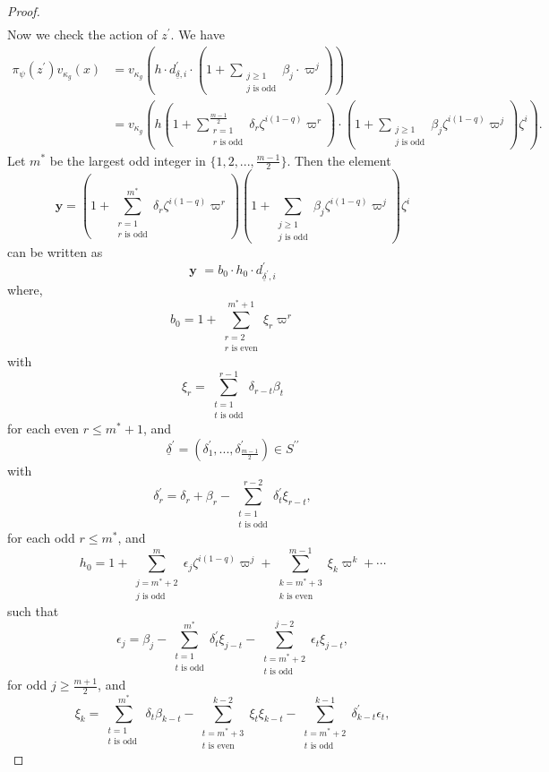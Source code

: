 \documentclass[10pt,a4paper]{amsart}
\begin{document}
\begin{proof}
\begin{align*}
\end{align*}
Now we check the action of $z^\prime$. We have 
\begin{align*}
\pi_\psi(z^\prime) v_{\kappa_g}(x) &= v_{\kappa_g}(h \cdot d_{\underline{\delta}, i}^\prime \cdot (1 + \sum\limits_{\substack{j \geq 1  \\    j \text{ is odd} }}\beta_j \cdot \varpi^j )) \\
&= v_{\kappa_g}\left( h (1 + \sum\limits_{\substack{ r = 1  \\  r \text{ is odd} }}^{\frac{m-1}{2}} \delta_r \zeta^{i(1-q)} \varpi^r)  \cdot (1 + \sum\limits_{\substack{j \geq 1  \\    j \text{ is odd} }}\beta_j  \zeta^{i(1-q)} \varpi^j ) \zeta^i \right).
\end{align*}
Let $m^*$ be the largest odd integer in $\{1,2,...,\frac{m-1}{2}\}$. Then the element 
\[\textbf{y} = (1 + \sum\limits_{\substack{r = 1  \\    r \text{ is odd} }}^{m^*} \delta_r \zeta^{i(1-q)} \varpi^r) (1 + \sum\limits_{\substack{j \geq 1  \\    j \text{ is odd} }}\beta_j  \zeta^{i(1-q)} \varpi^j ) \zeta^i\]
can be written as 
\[\textbf{y } = b_0 \cdot h_0 \cdot d^\prime_{\underline{\delta}^{\prime},i}\] 
where,
\[b_0 = 1 + \sum\limits_{\substack{r = 2 \\    r \text{ is even} }}^{m^*+1} \xi_r  \varpi^r \]
with 
\[\xi_r = \sum\limits_{\substack{t=1  \\    t \text{ is odd} }}^{r-1} \delta_{r-t}\beta_t \]
for each even $r \leq m^*+1$, 
and
\[\underline{\delta}^{\prime} = (\delta_1^{\prime},...,\delta_{\frac{m-1}{2}}^{\prime}) \in S^{\prime\prime}\]
with 
\[\delta_r^{\prime} = \delta_r + \beta_r  - \sum\limits_{\substack{t =1 \\    t \text{ is odd} }}^{r-2} \delta_t^{\prime} \xi_{r-t},\]
for each odd $r \leq m^*$, 
and
\[h_0 = 1 + \sum\limits_{\substack{j =m^*+2  \\    j \text{ is odd} }}^{m} \epsilon_j \zeta^{i(1-q)}\varpi^j + \sum\limits_{\substack{k =m^* +3 \\    k \text{ is even} }}^{m-1} \xi_k \varpi^k +  \cdots \]
such that
\[\epsilon_j = \beta_j -\sum\limits_{\substack{t=1  \\    t \text{ is odd} }}^{m^*} \delta_t^\prime \xi_{j-t}- \sum\limits_{\substack{t=m^* +2  \\    t \text{ is odd} }}^{j-2} \epsilon_t \xi_{j-t}, \]
for odd $j \geq \frac{m+1}{2}$,
and
\[\xi_k = \sum\limits_{\substack{t=1  \\    t \text{ is odd } }}^{m^*}\delta_t \beta_{k-t} -\sum\limits_{\substack{t=m^*+3  \\    t \text{ is even} }}^{k-2} \xi_t \xi_{k-t} - \sum\limits_{\substack{t=m^*+2  \\    t \text{ is odd} }}^{k-1} \delta_{k-t}^\prime \epsilon_{t},\]

\end{proof}
\end{document}
